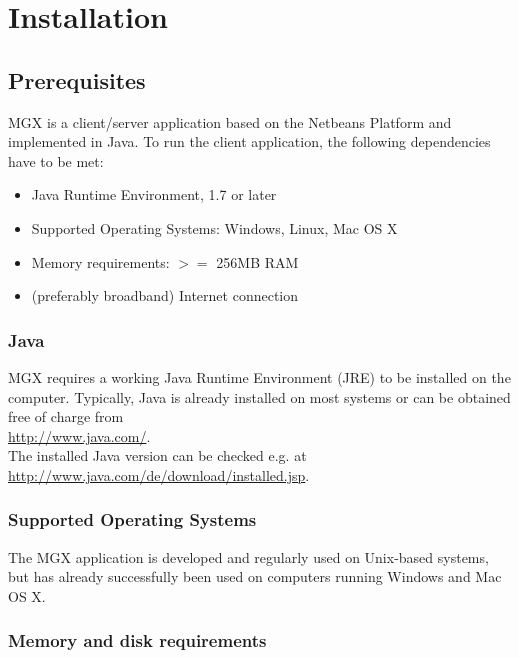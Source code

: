 
\chapter{Installation}
\label{installation}

\section{Prerequisites}

MGX is a client/server application based on the Netbeans Platform and implemented
in Java. To run the client application, the following dependencies have to be
met:

\begin{itemize}
  \item{Java Runtime Environment, 1.7 or later}
  \item{Supported Operating Systems: Windows, Linux, Mac OS X}
  \item{Memory requirements: $>=$ 256MB RAM}
  \item{(preferably broadband) Internet connection}
\end{itemize}

\subsection{Java}

MGX requires a working Java Runtime Environment (JRE) to be installed on the computer. Typically,
Java is already installed on most systems or can be obtained free of charge from\\

\url{http://www.java.com/}.\\

The installed Java version can be checked e.g. at\\

\url{http://www.java.com/de/download/installed.jsp}.

\subsection{Supported Operating Systems}

The MGX application is developed and regularly used on Unix-based systems,
but has already successfully been used on computers running Windows and
Mac OS X.

\subsection{Memory and disk requirements}

